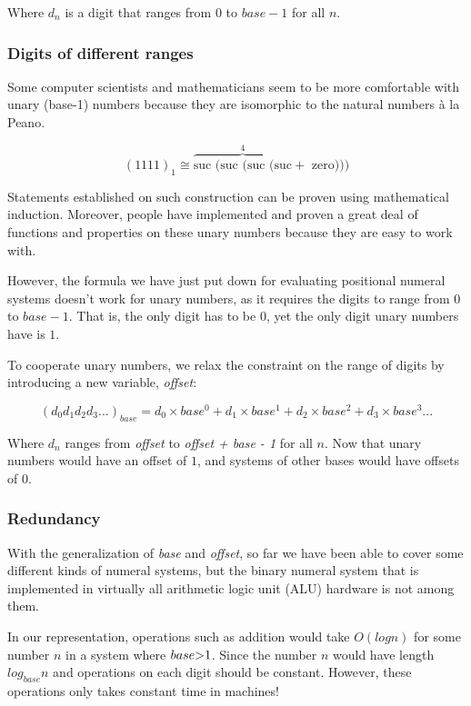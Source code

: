 \documentclass[../thesis.tex]{subfiles}
\begin{document}
Where $ d_{n} $ is a digit that ranges from $ 0 $ to $ base - 1 $ for all $ n $.


\subsubsection{Digits of different ranges}

Some computer scientists and mathematicians seem to be more comfortable with
unary (base-1) numbers because they are isomorphic to the natural numbers à la Peano.

$$
    (1111)_{1} \cong
        \overbrace{\text{suc (suc (suc (suc}}^4 + \text{ zero)))}
$$

Statements established on such construction can be proven using mathematical
induction. Moreover, people have implemented and proven a great deal of functions
and properties on these unary numbers because they are easy to work with.

However, the formula we have just put down for evaluating positional numeral systems
doesn't work for unary numbers, as it requires the digits to range from $ 0 $ to
$ base - 1 $. That is, the only digit has to be $ 0 $, yet the only digit unary
numbers have is $ 1 $.

To cooperate unary numbers, we relax the constraint on the range of digits
by introducing a new variable, \textit{offset}:

$$
    ({d_0d_1d_2d_3...})_{base}
    =
    d_0\times base^0 + d_1\times base^1 + d_2\times base^2 + d_3\times base^3 ...
$$

Where $ d_{n} $ ranges from \textit{offset} to \textit{offset + base - 1} for
all $ n $. Now that unary numbers would have an offset of $ 1 $,
and systems of other bases would have offsets of $ 0 $.

\subsubsection{Redundancy}

With the generalization of \textit{base} and \textit{offset}, so far we have been
able to cover some different kinds of numeral systems, but the binary numeral
system that is implemented in virtually all arithmetic logic unit (ALU) hardware
is not among them.

In our representation, operations such as addition would take $ O(log{}n)$ for some
number $ n $ in a system where $ base \text{\textgreater} 1 $. Since the number $ n $
would have length $ log_{base} n $ and operations on each digit should be constant.
However, these operations only takes constant time in machines!
\end{document}
